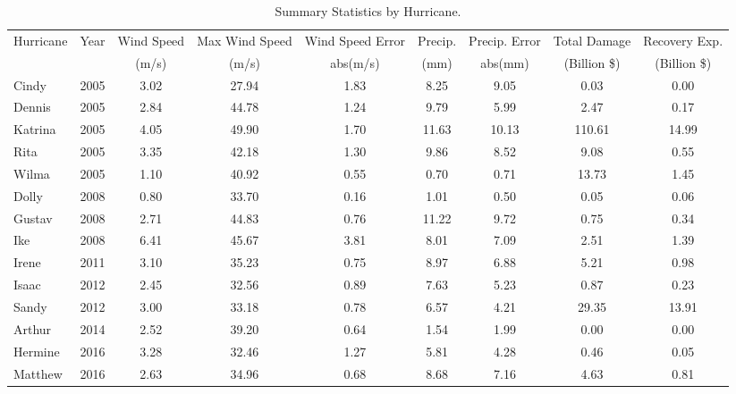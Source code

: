 \begin{table}

\caption{\label{tab:summary_dmg}Summary Statistics by Hurricane.}
\centering
\begin{adjustbox}{max width = \textwidth}
\begin{threeparttable}
\begin{tabular}[t]{lcccccccc}
\toprule
\multicolumn{1}{c}{Hurricane} & \multicolumn{1}{c}{Year} & \multicolumn{1}{c}{Wind Speed} & \multicolumn{1}{c}{Max Wind Speed} & \multicolumn{1}{c}{Wind Speed Error} & \multicolumn{1}{c}{Precip.} & \multicolumn{1}{c}{Precip. Error} & \multicolumn{1}{c}{Total Damage} & \multicolumn{1}{c}{Recovery Exp.} \\
\cmidrule(l{3pt}r{3pt}){1-1} \cmidrule(l{3pt}r{3pt}){2-2} \cmidrule(l{3pt}r{3pt}){3-3} \cmidrule(l{3pt}r{3pt}){4-4} \cmidrule(l{3pt}r{3pt}){5-5} \cmidrule(l{3pt}r{3pt}){6-6} \cmidrule(l{3pt}r{3pt}){7-7} \cmidrule(l{3pt}r{3pt}){8-8} \cmidrule(l{3pt}r{3pt}){9-9}
 &  & (m/s) & (m/s) & abs(m/s) & (mm) & abs(mm) & (Billion \$) & (Billion \$)\\
\midrule
Cindy & 2005 & 3.02 & 27.94 & 1.83 & 8.25 & 9.05 & 0.03 & 0.00\\
Dennis & 2005 & 2.84 & 44.78 & 1.24 & 9.79 & 5.99 & 2.47 & 0.17\\
Katrina & 2005 & 4.05 & 49.90 & 1.70 & 11.63 & 10.13 & 110.61 & 14.99\\
Rita & 2005 & 3.35 & 42.18 & 1.30 & 9.86 & 8.52 & 9.08 & 0.55\\
Wilma & 2005 & 1.10 & 40.92 & 0.55 & 0.70 & 0.71 & 13.73 & 1.45\\
Dolly & 2008 & 0.80 & 33.70 & 0.16 & 1.01 & 0.50 & 0.05 & 0.06\\
Gustav & 2008 & 2.71 & 44.83 & 0.76 & 11.22 & 9.72 & 0.75 & 0.34\\
Ike & 2008 & 6.41 & 45.67 & 3.81 & 8.01 & 7.09 & 2.51 & 1.39\\
Irene & 2011 & 3.10 & 35.23 & 0.75 & 8.97 & 6.88 & 5.21 & 0.98\\
Isaac & 2012 & 2.45 & 32.56 & 0.89 & 7.63 & 5.23 & 0.87 & 0.23\\
Sandy & 2012 & 3.00 & 33.18 & 0.78 & 6.57 & 4.21 & 29.35 & 13.91\\
Arthur & 2014 & 2.52 & 39.20 & 0.64 & 1.54 & 1.99 & 0.00 & 0.00\\
Hermine & 2016 & 3.28 & 32.46 & 1.27 & 5.81 & 4.28 & 0.46 & 0.05\\
Matthew & 2016 & 2.63 & 34.96 & 0.68 & 8.68 & 7.16 & 4.63 & 0.81\\

\end{tabular}
\end{threeparttable}
\end{adjustbox}
\end{table}
